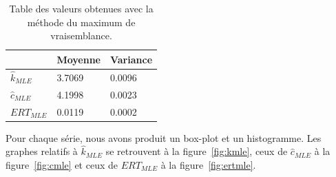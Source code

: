 \begin{table}
\centering
\begin{tabular}{|l|l|l|}
\hline
				& Moyenne 	& Variance\\
\hline
$\hat{k}_{MLE}$ & 3.7069 	& 0.0096\\
$\hat{c}_{MLE}$ & 4.1998 	& 0.0023\\
$ERT_{MLE}$			& 0.0119	& 0.0002\\
\hline
\end{tabular}
\caption{Table des valeurs obtenues avec la méthode du maximum de vraisemblance.}
\label{table:mle}
\end{table}

Pour chaque série, nous avons produit un box-plot et un histogramme. Les graphes relatifs à $\hat{k}_{MLE}$ se retrouvent à la figure~\ref{fig:kmle}, ceux de $\hat{c}_{MLE}$ à la figure~\ref{fig:cmle} et ceux de $ERT_{MLE}$ à la figure~\ref{fig:ertmle}.

